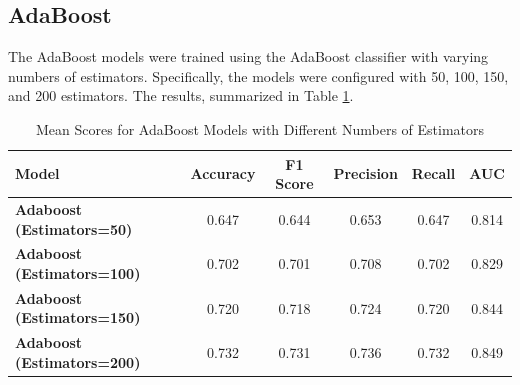 \subsection*{AdaBoost}
The AdaBoost models were trained using the AdaBoost classifier with varying numbers of estimators. Specifically, the models were configured with 50, 100, 150, and 200 estimators. The results, summarized in Table \ref{tab:adaboost_scores}.


\begin{table}[hhtbp]
    \centering
    \begin{tabular}{|l|c|c|c|c|c|}
    \hline
    \textbf{Model} & \textbf{Accuracy} & \textbf{F1 Score} & \textbf{Precision} & \textbf{Recall} & \textbf{AUC} \\ \hline
    \textbf{Adaboost (Estimators=50)} & 0.647 & 0.644 & 0.653 & 0.647 & 0.814 \\
    \textbf{Adaboost (Estimators=100)} & 0.702 & 0.701 & 0.708 & 0.702 & 0.829 \\
    \textbf{Adaboost (Estimators=150)} & 0.720 & 0.718 & 0.724 & 0.720 & 0.844 \\
    \textbf{Adaboost (Estimators=200)} & 0.732 & 0.731 & 0.736 & 0.732 & 0.849 \\ \hline
    \end{tabular}
    \caption{Mean Scores for AdaBoost Models with Different Numbers of Estimators}
    \label{tab:adaboost_scores}
    \end{table}
    
